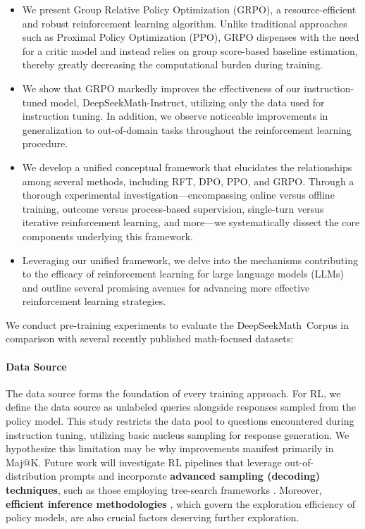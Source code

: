 \begin{itemize}[topsep=0pt]
    \item We present Group Relative Policy Optimization (GRPO), a resource-efficient and robust reinforcement learning algorithm. Unlike traditional approaches such as Proximal Policy Optimization (PPO), GRPO dispenses with the need for a critic model and instead relies on group score-based baseline estimation, thereby greatly decreasing the computational burden during training.
    \item We show that GRPO markedly improves the effectiveness of our instruction-tuned model, DeepSeekMath-Instruct, utilizing only the data used for instruction tuning. In addition, we observe noticeable improvements in generalization to out-of-domain tasks throughout the reinforcement learning procedure.
    \item We develop a unified conceptual framework that elucidates the relationships among several methods, including RFT, DPO, PPO, and GRPO. Through a thorough experimental investigation—encompassing online versus offline training, outcome versus process-based supervision, single-turn versus iterative reinforcement learning, and more—we systematically dissect the core components underlying this framework.
    \item Leveraging our unified framework, we delve into the mechanisms contributing to the efficacy of reinforcement learning for large language models (LLMs) and outline several promising avenues for advancing more effective reinforcement learning strategies.
\end{itemize}

We conduct pre-training experiments to evaluate the DeepSeekMath~Corpus in comparison with several recently published math-focused datasets:

\paragraph{Data Source} The data source forms the foundation of every training approach. For RL, we define the data source as unlabeled queries alongside responses sampled from the policy model. This study restricts the data pool to questions encountered during instruction tuning, utilizing basic nucleus sampling for response generation. We hypothesize this limitation may be why improvements manifest primarily in Maj@K. Future work will investigate RL pipelines that leverage out-of-distribution prompts and incorporate \textbf{advanced sampling (decoding) techniques}, such as those employing tree-search frameworks \citep{yao2023tree}. Moreover, \textbf{efficient inference methodologies} \citep{xia-etal-2023-speculative,leviathan2023fast,kwon2023efficient,xia2024unlocking}, which govern the exploration efficiency of policy models, are also crucial factors deserving further exploration.

